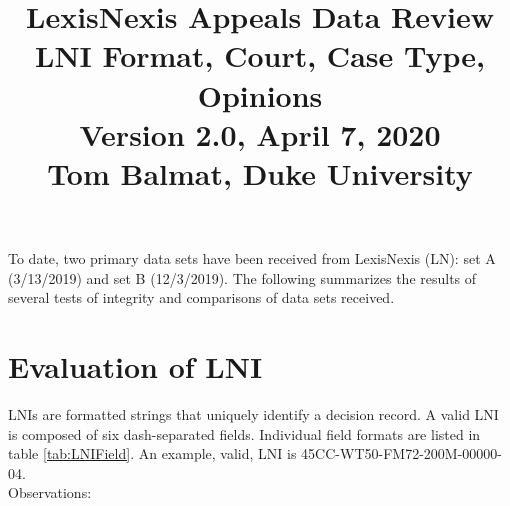 \documentclass[10pt, letterpaper]{article}
\title{\large LexisNexis Appeals Data Review\\[4pt]LNI Format, Court, Case Type, Opinions\\[4pt]
       \normalsize Version 2.0, April 7, 2020\\[4pt]Tom Balmat, Duke University\\[-20pt]}
\date{}
\begin{document}
    
\begin{spacing}{1.0}

\maketitle

To date, two primary data sets have been received from LexisNexis (LN):  set A (3/13/2019) and set B (12/3/2019).  The following summarizes the results of several tests of integrity and comparisons of data sets received.

\vspace{0.25in}

\renewcommand\cfttoctitlefont{\large}
\renewcommand\cftsecfont{\normalsize}
\renewcommand\cftsecpagefont{\normalsize}
\renewcommand\cftsubsecfont{\normalsize}
\renewcommand\cftsubsecpagefont{\normalsize}
\renewcommand{\cftsecleader}{\cftdotfill{\cftdotsep}}
\renewcommand*\contentsname{List of Sections}
\begin{center}
    \begin{minipage}{5.5in}
        \tableofcontents
    \end{minipage}
\end{center}


\clearpage

\section{Evaluation of LNI}

LNIs are formatted strings that uniquely identify a decision record.  A valid LNI is composed of six dash-separated fields.  Individual field formats are listed in table \ref{tab:LNIField}.  An example, valid, LNI is 45CC-WT50-FM72-200M-00000-04.\\

Observations:


\end{spacing}
\end{document}
